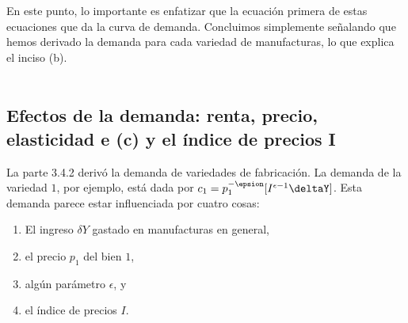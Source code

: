 En este punto, lo importante es enfatizar que la ecuación primera de estas ecuaciones que da la curva de demanda. Concluimos simplemente señalando que hemos derivado la demanda para cada variedad de manufacturas, lo que explica el inciso (b).\\\\

\subsection{Efectos de la demanda: renta, precio, elasticidad e (c) y el índice de precios I}
La parte 3.4.2 derivó la demanda de variedades de fabricación. La demanda de la variedad $1$, por ejemplo, está dada por $c_1 = p_1^{-\epsion}[I^{\epsilon-1} \deltaY]$. Esta demanda parece estar influenciada por cuatro cosas:

\begin{enumerate}[\bfseries (i)]
    \item  El ingreso $\delta Y$ gastado en manufacturas en general,
    \item  el precio $p_1$ del bien $1$,
    \item  algún parámetro $\epsilon$, y 
    \item  el índice de precios $I$.
\end{enumerate}

